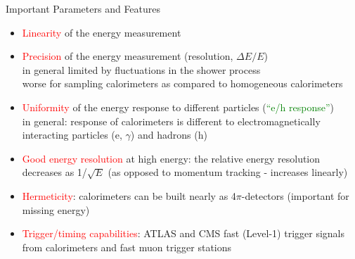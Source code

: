 \documentclass[style=husky,clock,size=9pt,dvipsnames]{powerdot}
\newcommand\myred{\textcolor{Red}} %
\newcommand\mygreen{\textcolor{Green}} %
\begin{document}
\begin{slide}[trans=Dissolve,toc=Features]{Important Parameters and Features}
    \pause
	\begin{itemize}[type=1]
		\item<2-> \myred{Linearity} of the energy measurement
		\vspace{0.3cm}
		\item <3-> \myred{Precision} of the energy measurement (resolution, $\Delta E/E$)\\\vspace{0.2cm}
		in general limited by fluctuations in the shower process\\\vspace{0.2cm}
		worse for sampling calorimeters as compared to homogeneous calorimeters
		\vspace{0.3cm}
		\item <4-> \myred{Uniformity} of the energy response to different particles (\mygreen{``e/h response''})\\\vspace{0.2cm}
		in general: response of calorimeters is different to electromagnetically interacting particles (e, $\gamma$) and hadrons (h)
		\vspace{0.3cm}
		\item <5->\myred{Good energy resolution} at high energy: the relative energy resolution decreases as 1/$\sqrt{E}$ (as opposed to momentum tracking - increases linearly)
		\vspace{0.3cm}
		\item <6->\myred{Hermeticity}: calorimeters can be built nearly as 4$\pi$-detectors (important for missing energy)
		\vspace{0.3cm}
		\item <7->\myred{Trigger/timing capabilities}: ATLAS and CMS fast (Level-1) trigger signals from calorimeters and fast muon trigger stations
	\end{itemize}
\end{slide}
\end{document}
